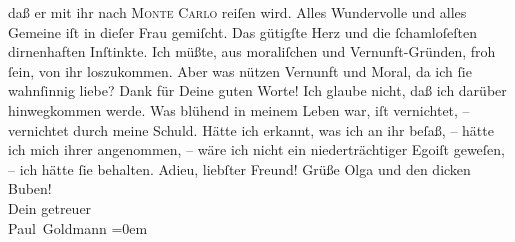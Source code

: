 \begin{ledgroupsized}[t]{13cm}
               daß er mit ihr nach \textsc{Monte Carlo} reiſen wird. Alles Wundervolle und alles Gemeine iſt in dieſer Frau gemiſcht. Das gütigſte
               Herz und die ſchamloſeſten dirnenhaften Inſtinkte. Ich müßte, aus moraliſchen und
               Vernunft-Gründen, froh ſein, von ihr loszukommen. Aber was nützen Vernunft und Moral,
               da ich ſie wahnſinnig liebe?\pend
           \pstart
           Dank für Deine guten Worte! {\pb}Ich glaube nicht, daß
               ich darüber hinwegkommen werde.  Was blühend in meinem Leben war, iſt vernichtet, –
               vernichtet durch meine Schuld. Hätte ich erkannt, was ich an ihr beſaß, – hätte ich
               mich ihrer angenommen, – wäre ich nicht ein niederträchtiger Egoiſt geweſen, – ich
               hätte ſie behalten.\pend
           \pstart
           Adieu, liebſter Freund! Grüße Olga und den
               dicken Buben! {\\[\baselineskip]}Dein
               getreuer {\\[\baselineskip]}\spacefill\mbox{Paul Goldmann}\pend
           \leftskip=0em{}
         
         \endnumbering{}\end{ledgroupsized}\begin{anhang}\end{anhang}\newcommand{\dateiname}{L03360}\newcommand{\titel}{Paul Goldmann an Arthur Schnitzler, 3. 1. [1903]}\newcommand{\editorInnen}{Martin Anton Müller und Laura Untner}
      